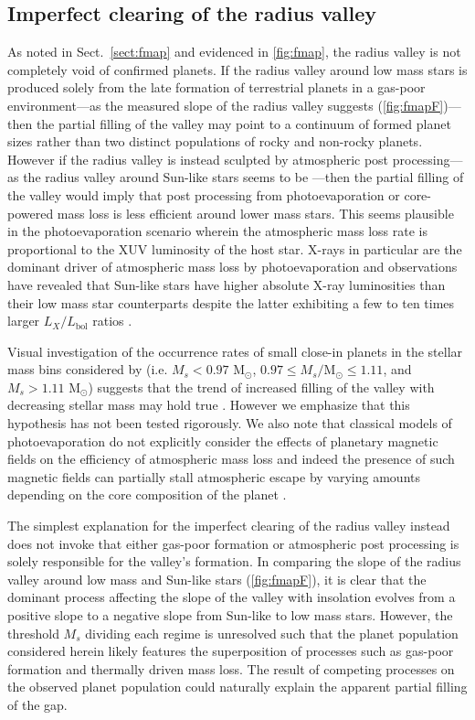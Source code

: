 \documentclass[twocolumn]{emulateapj}
\begin{document}
\subsection{Imperfect clearing of the radius valley} \label{sect:void}
As noted in Sect.~\ref{sect:fmap} and evidenced in \autoref{fig:fmap}, the radius valley is not completely
void of confirmed planets. If the radius valley around low mass stars is produced solely from the late formation
of terrestrial planets in a gas-poor environment---as the measured slope of the radius valley suggests
(\autoref{fig:fmapF})---then the partial filling of the valley may point to a continuum of formed planet sizes
rather than two distinct populations of rocky and non-rocky planets. However if the radius valley is instead
sculpted by atmospheric post processing---as the radius valley around Sun-like stars seems to be
\citep{fulton17,fulton18,vaneylen18,martinez19}---then the partial filling of the valley would imply that post
processing from photoevaporation or core-powered mass loss is less efficient around lower mass stars.
This seems plausible in the photoevaporation scenario wherein the atmospheric mass loss rate is proportional to
the XUV luminosity of the host star. X-rays in particular are the dominant driver of atmospheric mass loss by
photoevaporation and observations have revealed that Sun-like stars have higher absolute X-ray luminosities than
their low mass star counterparts \citep{mcdonald19} despite the latter exhibiting a few to ten times larger
$L_X/L_{\text{bol}}$ ratios \citep{jackson12,shkolnik14}. 

Visual
investigation of the occurrence rates of small close-in planets in the stellar mass bins considered by
\citealt{fulton18} (i.e. $M_s<0.97$ M$_{\odot}$, $0.97 \leq M_s/\text{M}_{\odot} \leq 1.11$, and $M_s>1.11$ M$_{\odot}$)
suggests that the trend of increased filling of the valley with decreasing stellar mass may hold true   
\citep[c.f. Figure 9;][]{fulton18}. However we emphasize that this hypothesis has not been tested rigorously.   
We also note that classical models of photoevaporation do not explicitly consider the effects of
planetary magnetic fields on the efficiency of atmospheric mass loss and indeed the presence of such magnetic
fields can partially stall atmospheric escape by varying amounts depending on the core composition of the
planet \citep{owen19}.

The simplest explanation for the imperfect clearing of the radius valley instead does not invoke that either
gas-poor formation or atmospheric post processing is solely responsible for the valley's formation.
In comparing the slope of the radius valley around low mass and Sun-like stars (\autoref{fig:fmapF}), it is
clear that the dominant process affecting the slope of the valley with insolation
evolves from a positive slope to a negative slope from Sun-like to low mass stars. However,
the threshold $M_s$ dividing each regime is unresolved such that the planet population considered herein
likely features the superposition of processes such as gas-poor formation and thermally driven mass loss. The
result of competing processes on the observed planet population could naturally explain the apparent
partial filling of the gap.
\end{document}
